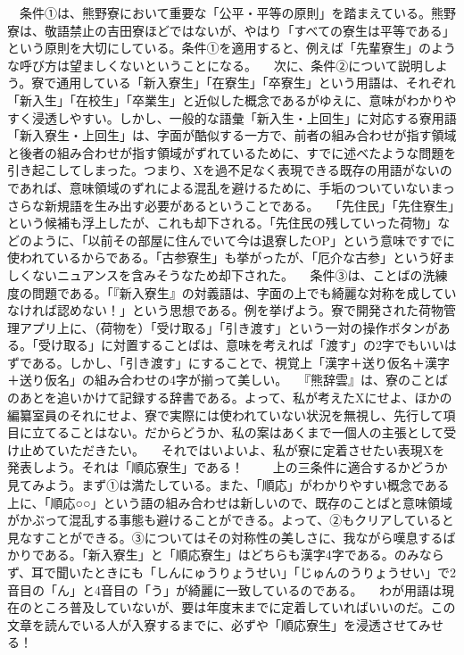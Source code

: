 　条件①は、熊野寮において重要な「公平・平等の原則」を踏まえている。熊野寮は、敬語禁止の吉田寮ほどではないが、やはり「すべての寮生は平等である」という原則を大切にしている。条件①を適用すると、例えば「先輩寮生」のような呼び方は望ましくないということになる。
　次に、条件②について説明しよう。寮で通用している「新入寮生」「在寮生」「卒寮生」という用語は、それぞれ「新入生」「在校生」「卒業生」と近似した概念であるがゆえに、意味がわかりやすく浸透しやすい。しかし、一般的な語彙「新入生・上回生」に対応する寮用語「新入寮生・上回生」は、字面が酷似する一方で、前者の組み合わせが指す領域と後者の組み合わせが指す領域がずれているために、すでに述べたような問題を引き起こしてしまった。つまり、Xを過不足なく表現できる既存の用語がないのであれば、意味領域のずれによる混乱を避けるために、手垢のついていないまっさらな新規語を生み出す必要があるということである。
　「先住民」「先住寮生」という候補も浮上したが、これも却下される。「先住民の残していった荷物」などのように、「以前その部屋に住んでいて今は退寮したOP」という意味ですでに使われているからである。「古参寮生」も挙がったが、「厄介な古参」という好ましくないニュアンスを含みそうなため却下された。
　条件③は、ことばの洗練度の問題である。「『新入寮生』の対義語は、字面の上でも綺麗な対称を成していなければ認めない！」という思想である。例を挙げよう。寮で開発された荷物管理アプリ上に、（荷物を）「受け取る」「引き渡す」という一対の操作ボタンがある。「受け取る」に対置することばは、意味を考えれば「渡す」の2字でもいいはずである。しかし、「引き渡す」にすることで、視覚上「漢字＋送り仮名＋漢字＋送り仮名」の組み合わせの4字が揃って美しい。
　『熊辞雲』は、寮のことばのあとを追いかけて記録する辞書である。よって、私が考えたXにせよ、ほかの編纂室員のそれにせよ、寮で実際には使われていない状況を無視し、先行して項目に立てることはない。だからどうか、私の案はあくまで一個人の主張として受け止めていただきたい。
　それではいよいよ、私が寮に定着させたい表現Xを発表しよう。それは「順応寮生」である！　
　上の三条件に適合するかどうか見てみよう。まず①は満たしている。また、「順応」がわかりやすい概念である上に、「順応○○」という語の組み合わせは新しいので、既存のことばと意味領域がかぶって混乱する事態も避けることができる。よって、②もクリアしていると見なすことができる。③についてはその対称性の美しさに、我ながら嘆息するばかりである。「新入寮生」と「順応寮生」はどちらも漢字4字である。のみならず、耳で聞いたときにも「しんにゅうりょうせい」「じゅんのうりょうせい」で2音目の「ん」と4音目の「う」が綺麗に一致しているのである。
　わが用語は現在のところ普及していないが、要は年度末までに定着していればいいのだ。この文章を読んでいる人が入寮するまでに、必ずや「順応寮生」を浸透させてみせる！


